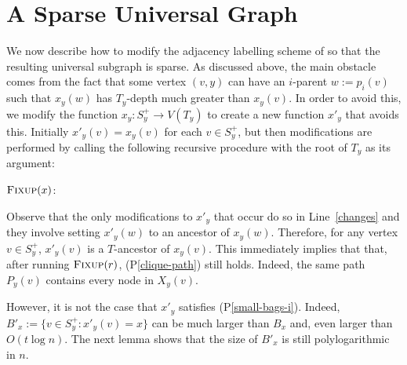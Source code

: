 \documentclass{patmorin}
\newcommand{\pref}[1]{(P\ref{#1})}
\begin{document}
\section{A Sparse Universal Graph}
\label{modifications}

We now describe how to modify the adjacency labelling scheme of \citet{dujmovic.esperet.ea:adjacency} so that the resulting universal subgraph is sparse.  As discussed above, the main obstacle comes from the fact that some vertex $(v,y)$ can have an $i$-parent $w:=p_i(v)$ such that $x_y(w)$ has $T_y$-depth much greater than $x_y(v)$.  In order to avoid this, we modify the function $x_y:S^+_y\to V(T_y)$ to create a new function $x'_y$ that avoids this. Initially $x'_y(v)=x_y(v)$ for each $v\in S^+_y$, but then modifications are performed by calling the following recursive procedure with the root of $T_y$ as its argument:

\noindent
\begin{minipage}{\textwidth}
    $\textsc{Fixup}(x)$:
    \begin{algorithmic}[1]
                \ENDIF
            \ENDFOR
        \ENDFOR
    \end{algorithmic}
\end{minipage}


Observe that the only modifications to $x'_y$ that occur do so in Line~\ref{changes} and they involve setting $x'_y(w)$ to an ancestor of $x_y(w)$.  Therefore, for any vertex $v\in S^+_y$, $x'_y(v)$ is a $T$-ancestor of $x_y(v)$.  This immediately implies that that, after running $\textsc{Fixup}(r)$, \pref{clique-path} still holds. Indeed, the same path $P_y(v)$ contains every node in $X_y(v)$.

However, it is not the case that $x'_y$ satisfies \pref{small-bags-i}.  Indeed, $B'_x:=\{v\in S^+_y: x'_y(v)=x\}$ can be much larger than $B_x$ and, even larger than $O(t\log n)$.  The next lemma shows that the size of $B'_x$ is still polylogarithmic in $n$.
\end{document}

